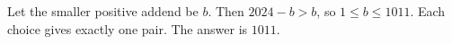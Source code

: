 Let the smaller positive addend be $b$. Then $2024-b>b$, so $1\le b\le1011$. Each choice gives exactly one pair. The answer is $\boxed{1011}$.
